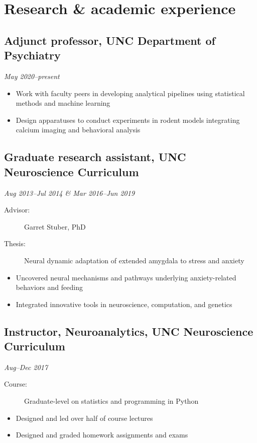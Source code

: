 \documentclass{article}
\newcommand{\dateformat}[1]{\textit{#1}}
\begin{document}
\section*{Research \& academic experience}
  \subsection*{Adjunct professor, UNC Department of Psychiatry}
    \dateformat{May 2020--present}
    \begin{itemize}
      \item Work with faculty peers in developing analytical pipelines using statistical methods and machine learning
      \item Design apparatuses to conduct experiments in rodent models integrating calcium imaging and behavioral analysis
    \end{itemize}

  \subsection*{Graduate research assistant, UNC Neuroscience Curriculum}
    \dateformat{Aug 2013--Jul 2014 \& Mar 2016--Jun 2019}
    \begin{description}
      \item[Advisor:] Garret Stuber, PhD
      \item[Thesis:] Neural dynamic adaptation of extended amygdala to stress and anxiety
    \end{description}
    \begin{itemize}
      \item Uncovered neural mechanisms and pathways underlying anxiety-related behaviors and feeding
      \item Integrated innovative tools in neuroscience, computation, and genetics
    \end{itemize}
    
  \subsection*{Instructor, Neuroanalytics, UNC Neuroscience Curriculum}
    \dateformat{Aug--Dec 2017}
    \begin{description}
      \item[Course:] Graduate-level on statistics and programming in Python
    \end{description}
    \begin{itemize}
      \item Designed and led over half of course lectures
      \item Designed and graded homework assignments and exams
    \end{itemize}
\end{document}
